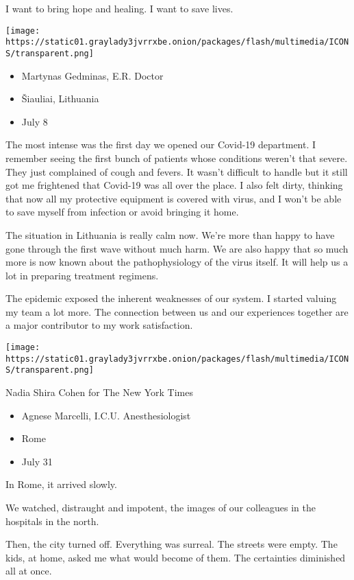 I want to bring hope and healing. I want to save lives.

\texttt{[image: https://static01.graylady3jvrrxbe.onion/packages/flash/multimedia/ICONS/transparent.png]}

\begin{itemize}
\tightlist
\item
  Martynas Gedminas, E.R. Doctor
\item
  Šiauliai, Lithuania
\item
  July 8
\end{itemize}

The most intense was the first day we opened our Covid-19 department. I
remember seeing the first bunch of patients whose conditions weren't
that severe. They just complained of cough and fevers. It wasn't
difficult to handle but it still got me frightened that Covid-19 was all
over the place. I also felt dirty, thinking that now all my protective
equipment is covered with virus, and I won't be able to save myself from
infection or avoid bringing it home.

The situation in Lithuania is really calm now. We're more than happy to
have gone through the first wave without much harm. We are also happy
that so much more is now known about the pathophysiology of the virus
itself. It will help us a lot in preparing treatment regimens.

The epidemic exposed the inherent weaknesses of our system. I started
valuing my team a lot more. The connection between us and our
experiences together are a major contributor to my work satisfaction.

\texttt{[image: https://static01.graylady3jvrrxbe.onion/packages/flash/multimedia/ICONS/transparent.png]}

Nadia Shira Cohen for The New York Times

\begin{itemize}
\tightlist
\item
  Agnese Marcelli, I.C.U. Anesthesiologist
\item
  Rome
\item
  July 31
\end{itemize}

In Rome, it arrived slowly.

We watched, distraught and impotent, the images of our colleagues in the
hospitals in the north.

Then, the city turned off. Everything was surreal. The streets were
empty. The kids, at home, asked me what would become of them. The
certainties diminished all at once.

